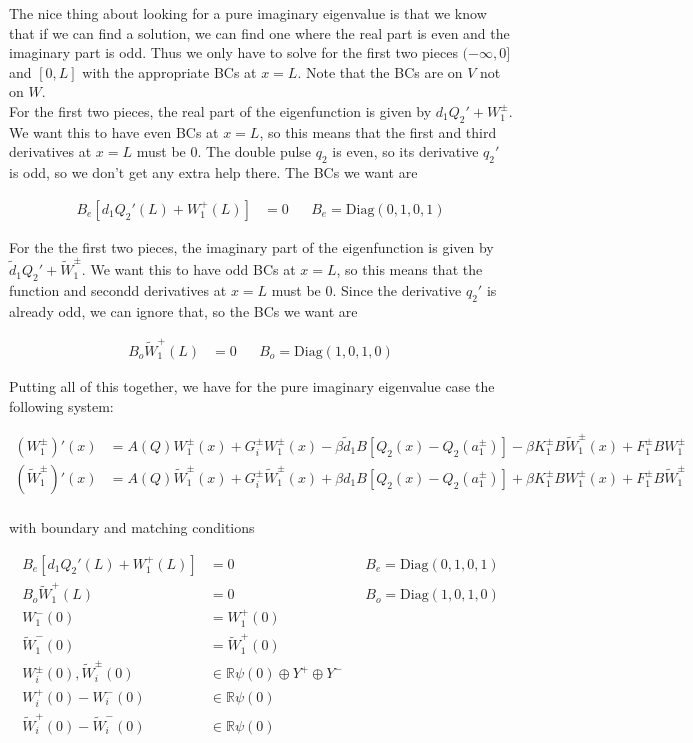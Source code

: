 \documentclass[12pt]{article}
\def\R{{\mathbb R}}
\begin{document}
The nice thing about looking for a pure imaginary eigenvalue is that we know that if we can find a solution, we can find one where the real part is even and the imaginary part is odd. Thus we only have to solve for the first two pieces $(-\infty, 0]$ and $[0, L]$ with the appropriate BCs at $x = L$. Note that the BCs are on $V$ not on $W$.\\

For the first two pieces, the real part of the eigenfunction is given by $d_1 Q_2' + W_1^\pm$. We want this to have even BCs at $x = L$, so this means that the first and third derivatives at $x = L$ must be 0. The double pulse $q_2$ is even, so its derivative $q_2'$ is odd, so we don't get any extra help there. The BCs we want are

\begin{align*}
B_e [d_1 Q_2'(L) + W_1^+(L)] &= 0  && B_e = \textrm{Diag}(0, 1, 0, 1)
\end{align*}

For the the first two pieces, the imaginary part of the eigenfunction is given by $\tilde{d}_1 Q_2' + \tilde{W}_1^\pm$. We want this to have odd BCs at $x = L$, so this means that the function and secondd derivatives at $x = L$ must be 0. Since the derivative $q_2'$ is already odd, we can ignore that, so the BCs we want are

\begin{align*}
B_o \tilde{W}_1^+(L) &= 0  && B_o = \textrm{Diag}(1, 0, 1, 0)
\end{align*}

Putting all of this together, we have for the pure imaginary eigenvalue case the following system:

\begin{align*}
(W_1^\pm)'(x) &= A(Q) W_1^\pm(x) + G_i^\pm W_1^\pm(x) -\beta \tilde{d}_1 B[ Q_2(x) - Q_2(a_1^\pm) ] - \beta K_1^\pm B \tilde{W}_1^\pm(x) + F_1^\pm B W_1^\pm \\
(\tilde{W}_1^\pm)'(x) &= A(Q) \tilde{W}_1^\pm(x) + G_i^\pm \tilde{W}_1^\pm(x) + \beta d_1 B[ Q_2(x) - Q_2(a_1^\pm) ] + \beta K_1^\pm B W_1^\pm(x) + F_1^\pm B \tilde{W}_1^\pm \\
\end{align*}

with boundary and matching conditions

\begin{align*}
B_e [d_1 Q_2'(L) + W_1^+(L)] &= 0  && B_e = \textrm{Diag}(0, 1, 0, 1) \\
B_o \tilde{W}_1^+(L) &= 0  && B_o = \textrm{Diag}(1, 0, 1, 0) \\
W_1^-(0) &= W_1^+(0) \\
\tilde{W}_1^-(0) &= \tilde{W}_1^+(0) \\
W_i^\pm(0), \tilde{W}_i^\pm(0) &\in \R \psi(0) \oplus Y^+ \oplus Y^- \\
W_i^+(0) - W_i^-(0) &\in \R \psi(0)  \\
\tilde{W}_i^+(0) - \tilde{W}_i^-(0) &\in \R \psi(0)
\end{align*}
\end{document}
